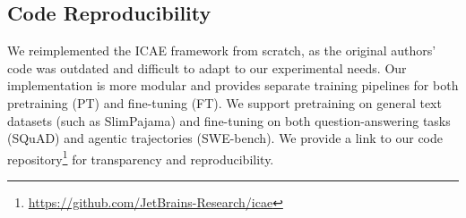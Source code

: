\subsection{Code Reproducibility}
We reimplemented the ICAE framework from scratch, as the original authors' code was outdated and difficult to adapt to our experimental needs.
Our implementation is more modular and provides separate training pipelines for both pretraining (PT) and fine-tuning (FT).
We support pretraining on general text datasets (such as SlimPajama) and fine-tuning on both question-answering tasks (SQuAD) and agentic trajectories (SWE-bench).
We provide a link to our code repository\footnote{\url{https://github.com/JetBrains-Research/icae}} for transparency and reproducibility.


